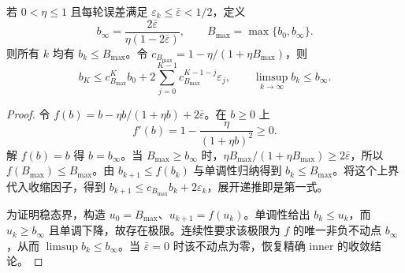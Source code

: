 \begin{theorem}
若 $0<\eta\leq1$ 且每轮误差满足 $\varepsilon_k\leq\bar\varepsilon<1/2$，定义
\begin{equation*}
 b_\infty=\frac{2\bar\varepsilon}{\eta(1-2\bar\varepsilon)},\qquad
 B_{\max}=\max\{b_0,b_\infty\}.
\end{equation*}
则所有 $k$ 均有 $b_k\leq B_{\max}$。令 $c_{B_{\max}}=1-\eta/(1+\eta B_{\max})$，则
\begin{equation*}
 b_K\leq c_{B_{\max}}^K b_0+
     2\sum_{j=0}^{K-1}c_{B_{\max}}^{K-1-j}\varepsilon_j,
 \qquad \limsup_{k\to\infty}b_k\leq b_\infty.
\end{equation*}
\end{theorem}

\begin{proof}
令 $f(b)=b-\eta b/(1+\eta b)+2\bar\varepsilon$。在 $b\geq0$ 上
\begin{equation*}
 f'(b)=1-\frac{\eta}{(1+\eta b)^2}\geq0.
\end{equation*}
解 $f(b)=b$ 得 $b=b_\infty$。当 $B_{\max}\geq b_\infty$ 时，$\eta B_{\max}/(1+\eta B_{\max})\geq2\bar\varepsilon$，所以 $f(B_{\max})\leq B_{\max}$。由 $b_{k+1}\leq f(b_k)$ 与单调性归纳得到 $b_k\leq B_{\max}$。将这个上界代入收缩因子，得到 $b_{k+1}\leq c_{B_{\max}} b_k+2\varepsilon_k$，展开递推即是第一式。

为证明稳态界，构造 $u_0=B_{\max}$、$u_{k+1}=f(u_k)$。单调性给出 $b_k\leq u_k$，而 $u_k\geq b_\infty$ 且单调下降，故存在极限。连续性要求该极限为 $f$ 的唯一非负不动点 $b_\infty$，从而 $\limsup b_k\leq b_\infty$。当 $\bar\varepsilon=0$ 时该不动点为零，恢复精确 inner 的收敛结论。
\end{proof}
